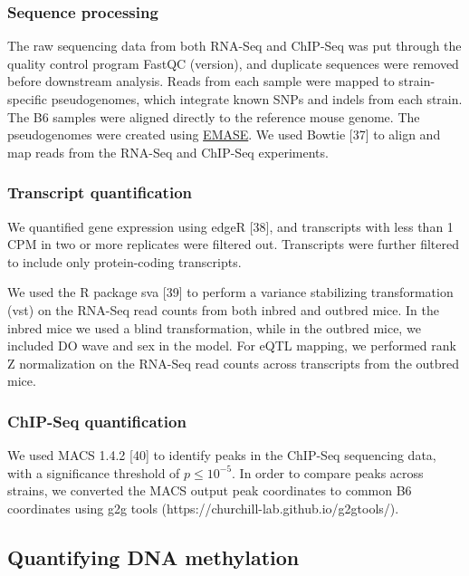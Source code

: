 \documentclass[10pt,letterpaper]{article}
\begin{document}
\hypertarget{sequence-processing}{%
\subsubsection{Sequence processing}\label{sequence-processing}}

The raw sequencing data from both RNA-Seq and ChIP-Seq was put through
the quality control program FastQC (version), and duplicate sequences
were removed before downstream analysis. Reads from each sample were
mapped to strain-specific pseudogenomes, which integrate known SNPs and
indels from each strain. The B6 samples were aligned directly to the
reference mouse genome. The pseudogenomes were created using
\href{https://github.com/churchill-lab/emase}{EMASE}. We used Bowtie
{[}37{]} to align and map reads from the RNA-Seq and ChIP-Seq
experiments.

\hypertarget{transcript-quantification}{%
\subsubsection{Transcript
quantification}\label{transcript-quantification}}

We quantified gene expression using edgeR {[}38{]}, and transcripts with
less than 1 CPM in two or more replicates were filtered out. Transcripts
were further filtered to include only protein-coding transcripts.

We used the R package sva {[}39{]} to perform a variance stabilizing
transformation (vst) on the RNA-Seq read counts from both inbred and
outbred mice. In the inbred mice we used a blind transformation, while
in the outbred mice, we included DO wave and sex in the model. For eQTL
mapping, we performed rank Z normalization on the RNA-Seq read counts
across transcripts from the outbred mice.

\hypertarget{chip-seq-quantification}{%
\subsubsection{ChIP-Seq quantification}\label{chip-seq-quantification}}

We used MACS 1.4.2 {[}40{]} to identify peaks in the ChIP-Seq sequencing
data, with a significance threshold of \(p \leq 10^{-5}\). In order to
compare peaks across strains, we converted the MACS output peak
coordinates to common B6 coordinates using g2g tools
(https://churchill-lab.github.io/g2gtools/).

\hypertarget{quantifying-dna-methylation}{%
\subsection{Quantifying DNA
methylation}\label{quantifying-dna-methylation}}
\end{document}
